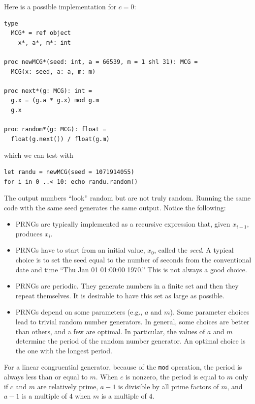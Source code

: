 \documentclass[justified, sixbynine]{tufte-book}
\def\ft{\small\tt}
\theoremstyle{plain}%
\newtheorem * {corollary}{Corollary}
\theoremstyle{definition}
\theoremstyle{remark}
\newtheorem * {remark}{Remark}
\newtheorem * {note}{Note}
\begin{document}
\begin{fullwidth}
Here is a possible implementation for $c=0$:
\begin{lstlisting}[caption={in file: {\ft nlib.nim}}]
type
  MCG* = ref object
    x*, a*, m*: int

proc newMCG*(seed: int, a = 66539, m = 1 shl 31): MCG =
  MCG(x: seed, a: a, m: m)

proc next*(g: MCG): int =
  g.x = (g.a * g.x) mod g.m
  g.x

proc random*(g: MCG): float =
  float(g.next()) / float(g.m)
\end{lstlisting}

which we can test with
\begin{lstlisting}
let randu = newMCG(seed = 1071914055)
for i in 0 ..< 10: echo randu.random()
\end{lstlisting}

The output numbers ``look'' random but are not truly random. Running the same code with the same seed generates the same output. Notice the following:

\begin{itemize}
\item  PRNGs are typically implemented as a recursive expression that, given $%
x_{i-1}$, produces $x_i$.



\item  PRNGs have to start from an initial value, $x_0$, called the {\it seed}.
A typical choice is to set the seed equal to the number of seconds from the
conventional date and time ``Thu Jan 01 01:00:00 1970.'' This is not always
a good choice.

\item PRNGs are periodic. They generate numbers in a finite set and then they repeat themselves. It is desirable to have this set as large as possible.

\item  PRNGs depend on some parameters (e.g., $a$ and $m$). Some
parameter choices lead to trivial random number generators. In
general, some choices are better than others, and a few are optimal. In
particular, the values of $a$ and $m$ determine the period of the random
number generator. An optimal choice is the one with the longest period.
\end{itemize}

For a linear congruential generator, because of the {\ft mod} operation, the period is always less than or equal to $m$. When $c$ is nonzero, the period is equal to $m$ only if $c$ and $m$ are relatively prime, $a-1$ is divisible by all prime factors of $m$, and $a-1$ is a multiple of 4 when $m$ is a multiple of $4$.


\end{fullwidth}
\end{document}
